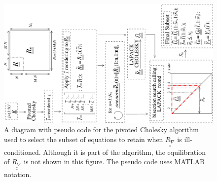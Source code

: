 \begin{figure}[p]
\centerline{\includegraphics[width=6.9truein,angle=-90]{images/PivotCholSelectEqnAlgorithm.pdf}}
\caption{A diagram with pseudo code for the pivoted Cholesky algorithm used to select the subset of equations to retain when $\underline{\underline{R_{\nabla}}}$ is ill-conditioned. Although it is part of the algorithm, the equilibration of $\underline{\underline{R_{\nabla}}}$ is not shown in this figure.  The pseudo code uses MATLAB notation.}
\label{fig:SubsetSelectAlgorithm}
\end{figure}

